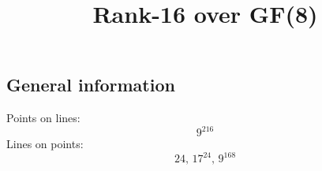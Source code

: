 \documentclass{article}
\newcommand\setTBstruts{\def\T{\rule{0pt}{2.6ex}}%
\def\B{\rule[-1.2ex]{0pt}{0pt}}}
\begin{document}
 
\setTBstruts



{\allowdisplaybreaks%






\title{Rank-16 over GF(8)}
\author{}%
\maketitle%
%
{}



\subsection*{General information}
Points on lines:
$$
9^{216}$$
Lines on points:
$$
24,\,17^{24},\,9^{168}$$
}
\end{document}
